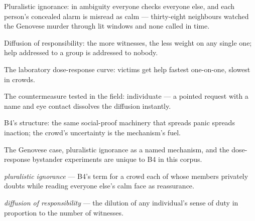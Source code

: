

\begin{distilled}
  \item Pluralistic ignorance: in ambiguity everyone checks everyone else, and each person's concealed alarm is misread as calm --- thirty-eight neighbours watched the Genovese murder through lit windows and none called in time.
  \item Diffusion of responsibility: the more witnesses, the less weight on any single one; help addressed to a group is addressed to nobody.
  \item The laboratory dose-response curve: victims get help fastest one-on-one, slowest in crowds.
  \item The countermeasure tested in the field: individuate --- a pointed request with a name and eye contact dissolves the diffusion instantly.
  \item B4's structure: the same social-proof machinery that spreads panic spreads inaction; the crowd's uncertainty is the mechanism's fuel.
\end{distilled}
\begin{unique}
  \item The Genovese case, pluralistic ignorance as a named mechanism, and the dose-response bystander experiments are unique to B4 in this corpus.
\end{unique}
\begin{terms}
  \item \emph{pluralistic ignorance} --- B4's term for a crowd each of whose members privately doubts while reading everyone else's calm face as reassurance.
  \item \emph{diffusion of responsibility} --- the dilution of any individual's sense of duty in proportion to the number of witnesses.
\end{terms}
